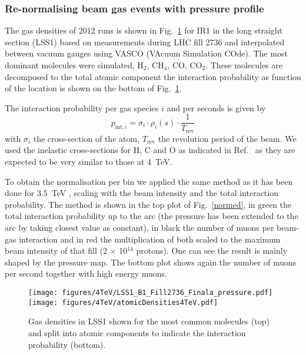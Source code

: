 \subsubsection{Re-normalising beam gas events with pressure profile}

The gas densities of 2012 runs is shown in Fig.~\ref{pressure2012} for IR1 in the long straight section (LSS1) based on measurements during LHC fill 2736 and interpolated between vacuum gauges using VASCO (VAcuum Simulation COde). The most dominant molecules were simulated, H$_2$, CH$_4$, CO, CO$_2$. These molecules are decomposed to the total atomic component the interaction probability as function of the location is shown on the bottom of Fig.~\ref{pressure2012}.

The interaction probability per gas species $i$ and per seconds is given by 
\begin{equation} \label{eq2}
p_{\mathrm{int},i} = \sigma_{i} \cdot \rho_{i}(s) \cdot \frac{1}{T_{\mathrm{rev}}}
\end{equation}
with $\sigma_i$ the cross-section of the atom, $T_{\mathrm{rev}}$ the revolution period of the beam. We used the inelastic cross-sections for H, C and O as indicated in Ref.~\cite{nimPaperRod} as they are expected to be very similar to those at 4~TeV.

To obtain the normalisation per bin we applied the same method as it has been done for 3.5~TeV \cite{nimPaperRod}, scaling with the beam intensity and the total interaction probability. The method is shown in the top plot of Fig.~\ref{normed}, in green the total interaction probability up to the arc (the pressure has been extended to the arc by taking closest value as constant), in black the number of muons per beam-gas interaction and in red the multiplication of both scaled to the maximum beam intensity of that fill (2 $\times$ 10$^{14}$ protons). One can see the result is mainly shaped by the pressure map. The bottom plot shows again the number of muons per second together with high energy muons. 


\begin{figure}[!htb]
\begin{center}
  \texttt{[image: figures/4TeV/LSS1\_B1\_Fill2736\_Finala\_pressure.pdf]}
  \texttt{[image: figures/4TeV/atomicDensities4TeV.pdf]}
\end{center}
\vspace{-0.6cm}
 \caption{Gas densities in LSS1 shown for the most common molecules (top) and split into atomic components to indicate the interaction probability (bottom).
  \label{pressure2012}}
\end{figure}

